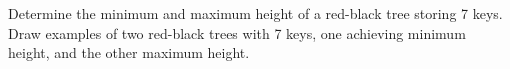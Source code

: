Determine the minimum and maximum height of a red-black tree storing 7
keys. Draw examples of two red-black trees with 7 keys, one achieving
minimum height, and the other maximum height.


